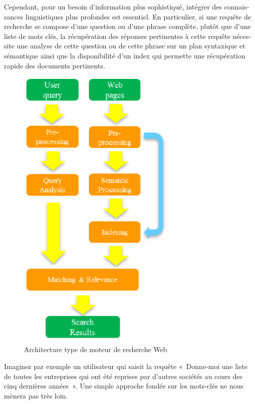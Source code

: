 \documentclass[]{../metanetpaper}
\begin{document}
\begin{french}
\begin{multicols}{2}
Cependant, pour un besoin d{\mbox '}information plus sophistiqué, intégrer des
connaissances linguistiques plus profondes est essentiel. En
particulier, si une requête de recherche se compose d{\mbox '}une question ou
d{\mbox '}une phrase complète, plutôt que d{\mbox '}une liste de mots clés, la
récupération des réponses pertinentes à cette requête nécessite une
analyse de cette question ou de cette phrase sur un plan syntaxique et
sémantique ainsi que la disponibilité d{\mbox '}un index qui permette une
récupération rapide des documents pertinents.

\begin{figure}[!ht]
\begin{center}
 \includegraphics[width=3.0in]{../_media/french/web_search_architecture}
 \caption{Architecture type de moteur de recherche Web}
\label{fig:archiweb}
\end{center}
\end{figure}

Imaginez par exemple un utilisateur qui saisit la requête «~Donne-moi
une liste de toutes les entreprises qui ont été reprises par d{\mbox '}autres
sociétés au cours des cinq dernières années~». Une simple approche
fondée sur les mots-clés ne nous mènera pas très loin.


\end{multicols}
\end{french}
\end{document}
